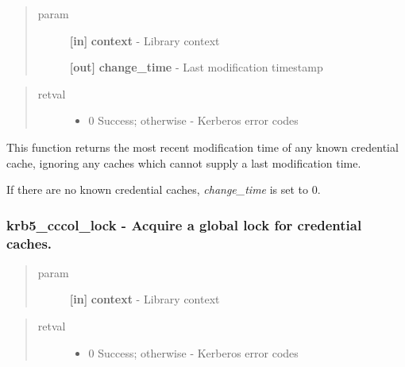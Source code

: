 \documentclass[letterpaper,10pt,english]{sphinxmanual}
\begin{document}
\begin{quote}\begin{description}
\item[{param}] \leavevmode
\textbf{{[}in{]}} \textbf{context} - Library context

\textbf{{[}out{]}} \textbf{change\_time} - Last modification timestamp

\end{description}\end{quote}
\begin{quote}\begin{description}
\item[{retval}] \leavevmode\begin{itemize}
\item {} 
0   Success; otherwise - Kerberos error codes

\end{itemize}

\end{description}\end{quote}

This function returns the most recent modification time of any known credential cache, ignoring any caches which cannot supply a last modification time.

If there are no known credential caches, \emph{change\_time} is set to 0.


\subsubsection{krb5\_cccol\_lock -  Acquire a global lock for credential caches.}
\label{appdev/refs/api/krb5_cccol_lock::doc}\label{appdev/refs/api/krb5_cccol_lock:krb5-cccol-lock-acquire-a-global-lock-for-credential-caches}

\begin{fulllineitems}
\label{appdev/refs/api/krb5_cccol_lock:c.krb5_cccol_lock}
\end{fulllineitems}

\begin{quote}\begin{description}
\item[{param}] \leavevmode
\textbf{{[}in{]}} \textbf{context} - Library context

\end{description}\end{quote}
\begin{quote}\begin{description}
\item[{retval}] \leavevmode\begin{itemize}
\item {} 
0   Success; otherwise - Kerberos error codes

\end{itemize}

\end{description}\end{quote}
\end{document}
